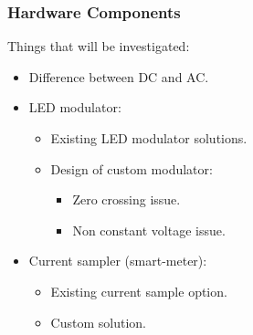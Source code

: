 \documentclass{beamer}
\begin{document}
	\begin{frame}\frametitle{Hardware Components}

		Things that will be investigated: 

		\begin{itemize}

			\item Difference between DC and AC.

			\item LED modulator:

			\begin{itemize}
				\item Existing LED modulator solutions.
				\item Design of custom modulator:
				\begin{itemize}
					\item Zero crossing issue.
					\item Non constant voltage issue.
				\end{itemize}

			\end{itemize}

			\item Current sampler (smart-meter):
			\begin{itemize}
				\item Existing current sample option.
				\item Custom solution.
			\end{itemize}

		\end{itemize}
		
	\end{frame}
\end{document}
